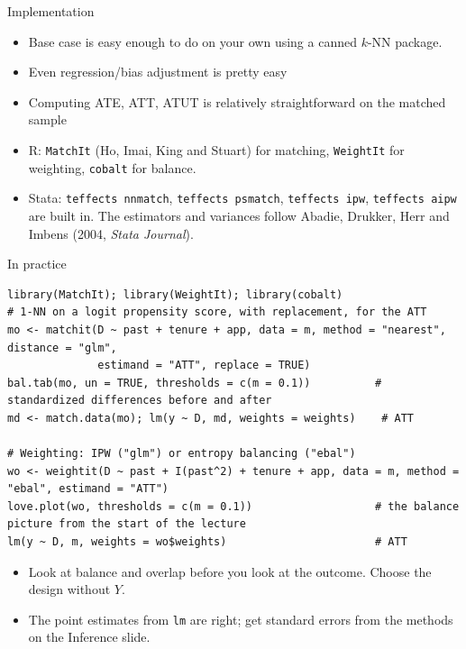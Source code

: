\documentclass[aspectratio=169,11pt]{beamer}
\begin{document}
\begin{frame}{Implementation}
\begin{itemize}
\item Base case is easy enough to do on your own using a canned $k$-NN package.
\item Even regression/bias adjustment is pretty easy
\item Computing ATE, ATT, ATUT is relatively straightforward on the matched sample
\item R: \texttt{MatchIt} (Ho, Imai, King and Stuart) for matching, \texttt{WeightIt} for weighting, \texttt{cobalt} for balance.
\item Stata: \texttt{teffects nnmatch}, \texttt{teffects psmatch}, \texttt{teffects ipw}, \texttt{teffects aipw} are built in.
The estimators and variances follow Abadie, Drukker, Herr and Imbens (2004, \emph{Stata Journal}).
\end{itemize}
\end{frame}


\begin{frame}[fragile]{In practice}
\begin{lstlisting}
library(MatchIt); library(WeightIt); library(cobalt)
# 1-NN on a logit propensity score, with replacement, for the ATT
mo <- matchit(D ~ past + tenure + app, data = m, method = "nearest", distance = "glm",
              estimand = "ATT", replace = TRUE)
bal.tab(mo, un = TRUE, thresholds = c(m = 0.1))          # standardized differences before and after
md <- match.data(mo); lm(y ~ D, md, weights = weights)    # ATT

# Weighting: IPW ("glm") or entropy balancing ("ebal")
wo <- weightit(D ~ past + I(past^2) + tenure + app, data = m, method = "ebal", estimand = "ATT")
love.plot(wo, thresholds = c(m = 0.1))                   # the balance picture from the start of the lecture
lm(y ~ D, m, weights = wo$weights)                       # ATT
\end{lstlisting}
\begin{itemize}
\item Look at balance and overlap before you look at the outcome. Choose the design without $Y$.
\item The point estimates from \texttt{lm} are right; get standard errors from the methods on the Inference slide.
\end{itemize}
\end{frame}
\end{document}
